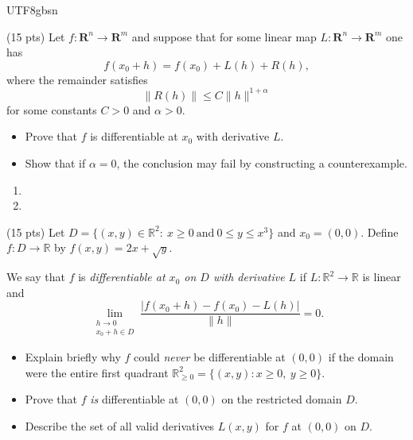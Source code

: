 \documentclass[addpoints]{exam}
\theoremstyle{definition}
\begin{document}
\begin{CJK*}{UTF8}{gbsn}
\begin{questions}
\begin{solution}
 \end{solution}

\question (15 pts) 
Let $f:\mathbf{R}^n\to\mathbf{R}^m$ and suppose that for some linear map
$L:\mathbf{R}^n\to\mathbf{R}^m$ one has
$$
f(x_0+h)=f(x_0)+L(h)+R(h),
$$
where the remainder satisfies
$$
\|R(h)\| \le C \|h\|^{1+\alpha}
$$
for some constants $C>0$ and $\alpha>0$.

\begin{itemize}
\item[(a)] Prove that $f$ is differentiable at $x_0$ with derivative $L$.

\item[(b)] Show that if $\alpha=0$, the conclusion may fail
by constructing a counterexample.
\end{itemize}


\begin{solution}

\begin{enumerate}
\item[(a)] 



\bigskip
\item[(b)] 




\end{enumerate} 
\end{solution}

\question (15 pts) Let $D=\{(x,y)\in\mathbb{R}^2:\ x\ge 0\ \text{and}\ 0\le y\le x^3\}$ and $x_0=(0,0)$.
Define $f:D\to\mathbb{R}$ by $f(x,y)=2x+\sqrt{y}$.

We say that $f$ is \emph{differentiable at $x_0$ on $D$ with derivative $L$} if
$L:\mathbb{R}^2\to\mathbb{R}$ is linear and
\[
\lim_{\substack{h\to 0\\ x_0+h\in D}}
\frac{|f(x_0+h)-f(x_0)-L(h)|}{\|h\|}=0.
\]

\begin{itemize}
\item[(a)] Explain briefly why $f$ could \emph{never} be differentiable at $(0,0)$ if the domain were the entire first quadrant $\mathbb{R}^2_{\ge 0}=\{(x,y):x\ge 0,\ y\ge 0\}$.

\item[(b)] Prove that $f$ \emph{is} differentiable at $(0,0)$ on the restricted domain $D$.

\item[(c)] Describe the set of all valid derivatives $L(x,y)$ for $f$ at $(0,0)$ on $D$.
\end{itemize}


\end{questions}
\end{CJK*}
\end{document}
